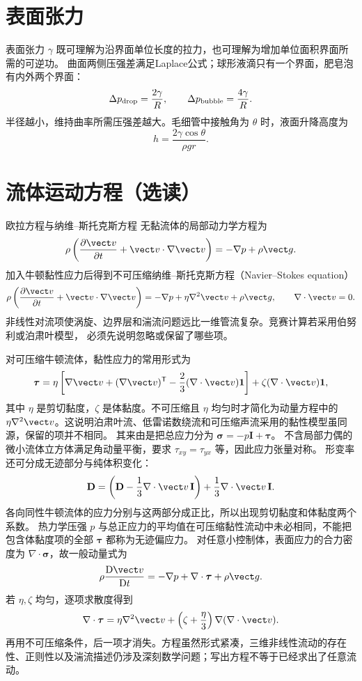 \section{表面张力}\label{ch13:sec:surface}

表面张力 $\gamma$ 既可理解为沿界面单位长度的拉力，也可理解为增加单位面积界面所需的可逆功。
曲面两侧压强差满足Laplace公式；球形液滴只有一个界面，肥皂泡有内外两个界面：
\begin{equation}
 \Delta p_{\rm drop}=\frac{2\gamma}{R},\qquad
 \Delta p_{\rm bubble}=\frac{4\gamma}{R}.
\end{equation}
半径越小，维持曲率所需压强差越大。毛细管中接触角为 $\theta$ 时，液面升降高度为
\begin{equation}
 h=\frac{2\gamma\cos\theta}{\rho gr}.
\end{equation}


\section{流体运动方程（选读）}\label{ch13:sec:equations-reading}
\begin{starread}{欧拉方程与纳维--斯托克斯方程}
无黏流体的局部动力学方程为
\[
 \rho\left(\frac{\partial\vect v}{\partial t}+\vect v\cdot\nabla\vect v\right)
 =-\nabla p+\rho\vect g.
\]
加入牛顿黏性应力后得到不可压缩纳维--斯托克斯方程（Navier--Stokes equation）
\[
 \rho\left(\frac{\partial\vect v}{\partial t}+\vect v\cdot\nabla\vect v\right)
 =-\nabla p+\eta\nabla^2\vect v+\rho\vect g,
 \qquad \nabla\cdot\vect v=0.
\]
非线性对流项使涡旋、边界层和湍流问题远比一维管流复杂。竞赛计算若采用伯努利或泊肃叶模型，
必须先说明忽略或保留了哪些项。

对可压缩牛顿流体，黏性应力的常用形式为
\[
 \boldsymbol\tau=\eta\left[\nabla\vect v+(\nabla\vect v)^{\mathsf T}
 -\frac23(\nabla\cdot\vect v)\mathbf 1\right]+\zeta(\nabla\cdot\vect v)\mathbf 1,
\]
其中 $\eta$ 是剪切黏度，$\zeta$ 是体黏度。不可压缩且 $\eta$ 均匀时才简化为动量方程中的 $\eta\nabla^2\vect v$。这说明泊肃叶流、低雷诺数绕流和可压缩声流采用的黏性模型虽同源，保留的项并不相同。
其来由是把总应力分为 $\boldsymbol\sigma=-p\mathbf I+\boldsymbol\tau$。
不含局部力偶的微小流体立方体满足角动量平衡，要求 $\tau_{xy}=\tau_{yx}$ 等，因此应力张量对称。
形变率还可分成无迹部分与纯体积变化：
\[
 \mathbf D=\left(\mathbf D-\frac13\nabla\cdot\vect v\,\mathbf I\right)
 +\frac13\nabla\cdot\vect v\,\mathbf I.
\]
各向同性牛顿流体的应力分别与这两部分成正比，所以出现剪切黏度和体黏度两个系数。
热力学压强 $p$ 与总正应力的平均值在可压缩黏性流动中未必相同，不能把包含体黏度项的全部 $\boldsymbol\tau$ 都称为无迹偏应力。
对任意小控制体，表面应力的合力密度为 $\nabla\cdot\boldsymbol\sigma$，故一般动量式为
\[
 \rho\frac{\mathrm D\vect v}{\mathrm Dt}=-\nabla p+\nabla\cdot\boldsymbol\tau+\rho\vect g.
\]
若 $\eta,\zeta$ 均匀，逐项求散度得到
\[
 \nabla\cdot\boldsymbol\tau=\eta\nabla^2\vect v+
 \left(\zeta+\frac\eta3\right)\nabla(\nabla\cdot\vect v).
\]
再用不可压缩条件，后一项才消失。方程虽然形式紧凑，三维非线性流动的存在性、正则性以及湍流描述仍涉及深刻数学问题；写出方程不等于已经求出了任意流动。
\end{starread}
